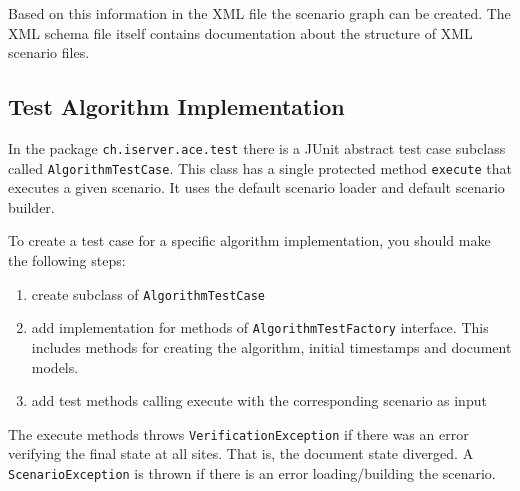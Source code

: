 \documentclass[11pt,a4paper]{article}
\begin{document}
Based on this information in the XML file the scenario graph can be created. The XML schema file itself contains documentation about the structure of XML scenario files.


\subsection{Test Algorithm Implementation}
In the package \texttt{ch.iserver.ace.test} there is a JUnit abstract test case subclass called \texttt{AlgorithmTestCase}. This class has a single protected method \texttt{execute} that executes a given scenario. It uses the default scenario loader and default scenario builder. 

To create a test case for a specific algorithm implementation, you should make the following steps:

\begin{enumerate}
 \item create subclass of \texttt{AlgorithmTestCase}
 \item add implementation for methods of \texttt{AlgorithmTestFactory} interface.
       This includes methods for creating the algorithm, initial timestamps
       and document models.
 \item add test methods calling execute with the corresponding scenario
       as input
\end{enumerate} 

The execute methods throws \texttt{VerificationException} if there was an error verifying the final state at all sites. That is, the document state diverged. A \texttt{ScenarioException} is thrown if there is an error loading/building the scenario.
\end{document}
